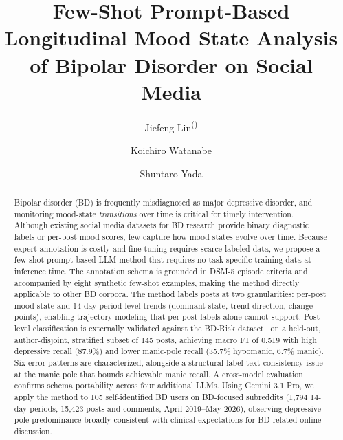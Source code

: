 \documentclass[runningheads]{llncs}
\begin{document}
\title{Few-Shot Prompt-Based Longitudinal Mood State Analysis of Bipolar Disorder on Social Media}

\author{Jiefeng Lin\textsuperscript{(\Envelope)} \and
Koichiro Watanabe \and
Shuntaro Yada}


\maketitle


\begin{abstract}
Bipolar disorder (BD) is frequently misdiagnosed as major depressive disorder, and monitoring mood-state \emph{transitions} over time is critical for timely intervention. Although existing social media datasets for BD research provide binary diagnostic labels or per-post mood scores, few capture how mood states evolve over time. Because expert annotation is costly and fine-tuning requires scarce labeled data, we propose a few-shot prompt-based LLM method that requires no task-specific training data at inference time. The annotation schema is grounded in DSM-5 episode criteria and accompanied by eight synthetic few-shot examples, making the method directly applicable to other BD corpora. The method labels posts at two granularities: per-post mood state and 14-day period-level trends (dominant state, trend direction, change points), enabling trajectory modeling that per-post labels alone cannot support. Post-level classification is externally validated against the BD-Risk dataset~\cite{lee2024detecting} on a held-out, author-disjoint, stratified subset of 145 posts, achieving macro F1 of 0.519 with high depressive recall (87.9\%) and lower manic-pole recall (35.7\% hypomanic, 6.7\% manic). Six error patterns are characterized,  alongside a structural label-text consistency issue at the manic pole that bounds achievable manic recall. A cross-model evaluation confirms schema portability across four additional LLMs. Using Gemini 3.1 Pro, we apply the method to 105 self-identified BD users on BD-focused subreddits (1,794 14-day periods, 15,423 posts and comments, April 2019--May 2026), observing depressive-pole predominance broadly consistent with clinical expectations for BD-related online discussion.

\end{abstract}
\end{document}
